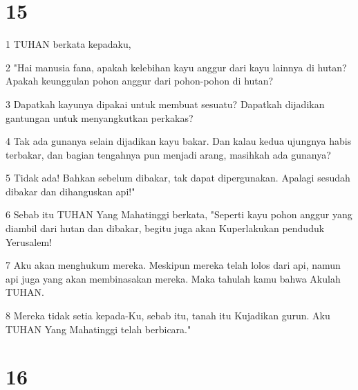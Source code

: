 \chapter{15}

\par 1 TUHAN berkata kepadaku,
\par 2 "Hai manusia fana, apakah kelebihan kayu anggur dari kayu lainnya di hutan? Apakah keunggulan pohon anggur dari pohon-pohon di hutan?
\par 3 Dapatkah kayunya dipakai untuk membuat sesuatu? Dapatkah dijadikan gantungan untuk menyangkutkan perkakas?
\par 4 Tak ada gunanya selain dijadikan kayu bakar. Dan kalau kedua ujungnya habis terbakar, dan bagian tengahnya pun menjadi arang, masihkah ada gunanya?
\par 5 Tidak ada! Bahkan sebelum dibakar, tak dapat dipergunakan. Apalagi sesudah dibakar dan dihanguskan api!"
\par 6 Sebab itu TUHAN Yang Mahatinggi berkata, "Seperti kayu pohon anggur yang diambil dari hutan dan dibakar, begitu juga akan Kuperlakukan penduduk Yerusalem!
\par 7 Aku akan menghukum mereka. Meskipun mereka telah lolos dari api, namun api juga yang akan membinasakan mereka. Maka tahulah kamu bahwa Akulah TUHAN.
\par 8 Mereka tidak setia kepada-Ku, sebab itu, tanah itu Kujadikan gurun. Aku TUHAN Yang Mahatinggi telah berbicara."

\chapter{16}

